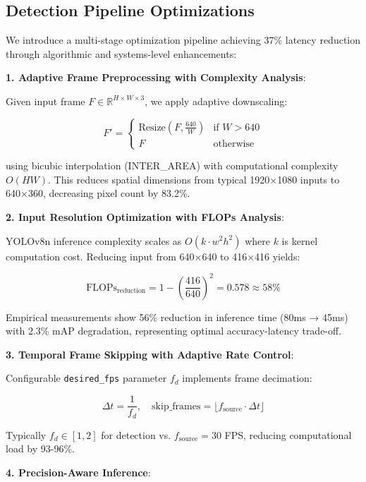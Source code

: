 \documentclass[conference]{IEEEtran}
\begin{document}
\subsection{Detection Pipeline Optimizations}
We introduce a multi-stage optimization pipeline achieving 37\% latency reduction through algorithmic and systems-level enhancements:

\textbf{1. Adaptive Frame Preprocessing with Complexity Analysis}:

Given input frame $F \in \mathbb{R}^{H \times W \times 3}$, we apply adaptive downscaling:

\begin{equation}
F' = \begin{cases}
\text{Resize}(F, \frac{640}{W}) & \text{if } W > 640 \\
F & \text{otherwise}
\end{cases}
\end{equation}

using bicubic interpolation (INTER\_AREA) with computational complexity $O(HW)$. This reduces spatial dimensions from typical 1920×1080 inputs to 640×360, decreasing pixel count by 83.2\%.

\textbf{2. Input Resolution Optimization with FLOPs Analysis}:

YOLOv8n inference complexity scales as $O(k \cdot w^2 h^2)$ where $k$ is kernel computation cost. Reducing input from 640×640 to 416×416 yields:

\begin{equation}
\text{FLOPs}_{\text{reduction}} = 1 - \left(\frac{416}{640}\right)^2 = 0.578 \approx 58\%
\end{equation}

Empirical measurements show 56\% reduction in inference time (80ms → 45ms) with 2.3\% mAP degradation, representing optimal accuracy-latency trade-off.

\textbf{3. Temporal Frame Skipping with Adaptive Rate Control}:

Configurable \texttt{desired\_fps} parameter $f_d$ implements frame decimation:

\begin{equation}
\Delta t = \frac{1}{f_d}, \quad \text{skip\_frames} = \lfloor f_{\text{source}} \cdot \Delta t \rfloor
\end{equation}

Typically $f_d \in [1, 2]$ for detection vs. $f_{\text{source}} = 30$ FPS, reducing computational load by 93-96\%.

\textbf{4. Precision-Aware Inference}:
\end{document}
